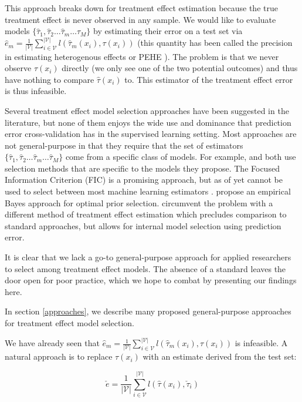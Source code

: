 This approach breaks down for treatment effect estimation because the true treatment effect is never observed in any sample. We would like to evaluate models $\{\hat\tau_1, \hat\tau_2 \dots \hat \tau_m \dots \hat \tau_M\}$ by estimating their error on a test set via $\hat e_m = \frac{1}{|\mathcal{V}|}\sum_{i \in \mathcal{V}}^{|\mathcal{V}|}  l(\hat \tau_m (x_i), \tau(x_i))$ (this quantity has been called the precision in estimating heterogenous effects or PEHE \cite{Hill2011}). The problem is that we never observe $\tau(x_i)$ directly (we only see one of the two potential outcomes) and thus have nothing to compare $\hat\tau(x_i)$ to. This estimator of the treatment effect error is thus infeasible.

Several treatment effect model selection approaches have been suggested in the literature, but none of them enjoys the wide use and dominance that prediction error cross-validation has in the supervised learning setting. Most approaches are not general-purpose in that they require that the set of estimators $\{\hat\tau_1, \hat\tau_2 \dots \hat \tau_m \dots \hat \tau_M\}$ come from a specific class of models. For example, \citet{Powers:2017wd} and \citet{Athey2015} both use selection methods that are specific to the models they propose. The Focused Information Criterion (FIC) \cite{Claeskens:2003ck} is a promising approach, but as of yet cannot be used to select between most machine learning estimators \cite{Jullum:2012uo}. \citet{Alaa:tj} propose an empirical Bayes approach for optimal prior selection. \citet{Nie:2017vi} circumvent the problem with a different method of treatment effect estimation which precludes comparison to standard approaches, but allows for internal model selection using prediction error. 

It is clear that we lack a go-to general-purpose approach for applied researchers to select among treatment effect models. The absence of a standard leaves the door open for poor practice, which we hope to combat by presenting our findings here.

In section \ref{approaches}, we describe many proposed general-purpose approaches for treatment effect model selection.

We have already seen that $\hat e_m = \frac{1}{|\mathcal{V}|}\sum_{i \in \mathcal{V}}^{|\mathcal{V}|}  l(\hat \tau_m (x_i), \tau(x_i))$ is infeasible. A natural approach is to replace $\tau(x_i)$ with an estimate derived from the test set:

\begin{equation}
\check e = \frac{1}{|\mathcal{V}|}\sum_{i \in \mathcal{V}}^{|\mathcal{V}|}  l(\hat \tau (x_i), \check \tau_i)
\label{te-error}
\end{equation}

